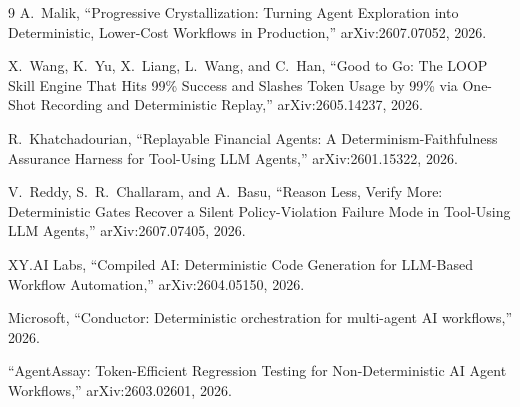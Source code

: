 \documentclass[10pt,conference]{article}
\begin{document}
\begin{thebibliography}{9}
A.~Malik,
\newblock ``Progressive Crystallization: Turning Agent Exploration into
Deterministic, Lower-Cost Workflows in Production,''
\newblock arXiv:2607.07052, 2026.

X.~Wang, K.~Yu, X.~Liang, L.~Wang, and C.~Han,
\newblock ``Good to Go: The LOOP Skill Engine That Hits 99\% Success and Slashes
Token Usage by 99\% via One-Shot Recording and Deterministic Replay,''
\newblock arXiv:2605.14237, 2026.

R.~Khatchadourian,
\newblock ``Replayable Financial Agents: A Determinism-Faithfulness Assurance
Harness for Tool-Using LLM Agents,''
\newblock arXiv:2601.15322, 2026.

V.~Reddy, S.~R.~Challaram, and A.~Basu,
\newblock ``Reason Less, Verify More: Deterministic Gates Recover a Silent
Policy-Violation Failure Mode in Tool-Using LLM Agents,''
\newblock arXiv:2607.07405, 2026.

XY.AI Labs,
\newblock ``Compiled AI: Deterministic Code Generation for LLM-Based Workflow
Automation,''
\newblock arXiv:2604.05150, 2026.

Microsoft,
\newblock ``Conductor: Deterministic orchestration for multi-agent AI
workflows,'' 2026.

``AgentAssay: Token-Efficient Regression Testing for Non-Deterministic AI Agent
Workflows,''
\newblock arXiv:2603.02601, 2026.
\end{thebibliography}
\end{document}
